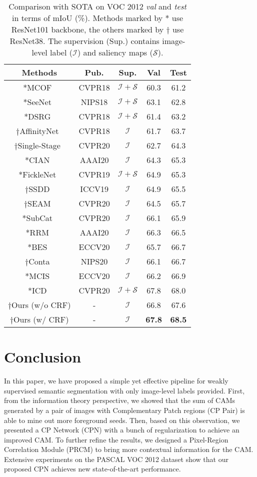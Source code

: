 \documentclass[10pt,twocolumn,letterpaper]{article}
\begin{document}
\begin{table}[!htbp]\small
\centering
\begin{tabular}{c|c|c|c|c}
\hline
Methods & Pub. & Sup. & Val & Test \\
\hline
*MCOF~\cite{MCOF} & CVPR18& $\mathcal{I+S}$ & 60.3 & 61.2\\
*SeeNet~\cite{Seenet} & NIPS18 & $\mathcal{I+S}$ & 63.1 & 62.8 \\
*DSRG~\cite{dsrg} &CVPR18 & $\mathcal{I+S}$ & 61.4 & 63.2\\
$\dagger$AffinityNet~\cite{affinity}&CVPR18&$\mathcal{I}$&61.7&63.7\\
$\dagger$Single-Stage~\cite{1stage} &CVPR20&$\mathcal{I}$&62.7&64.3\\
*CIAN~\cite{CIAN}&AAAI20&$\mathcal{I}$&64.3&65.3\\
*FickleNet~\cite{fickle}&CVPR19&$\mathcal{I+S}$&64.9&65.3\\
$\dagger$SSDD~\cite{SSDD}&ICCV19&$\mathcal{I}$&64.9&65.5\\
$\dagger$SEAM~\cite{seam}&CVPR20&$\mathcal{I}$&64.5&65.7\\
*SubCat~\cite{subE} &CVPR20&$\mathcal{I}$&66.1&65.9\\
*RRM~\cite{RMM} &AAAI20&$\mathcal{I}$&66.3&66.5\\
*BES~\cite{BES} &ECCV20&$\mathcal{I}$&65.7&66.7\\
$\dagger$Conta~\cite{conta}&NIPS20&$\mathcal{I}$&66.1&66.7\\
*MCIS~\cite{coatten}&ECCV20&$\mathcal{I}$&66.2&66.9\\
*ICD~\cite{ICD}&CVPR20&$\mathcal{I+S}$&67.8&68.0\\
\hline
$\dagger$Ours (w/o CRF) &-&$\mathcal{I}$&66.8&67.6\\
$\dagger$Ours (w/ CRF) &-&$\mathcal{I}$&\textbf{67.8}&\textbf{68.5}\\
\hline
\end{tabular}
\caption{Comparison with SOTA on VOC 2012 \textit{val} and \textit{test} in terms of mIoU (\%). Methods marked by * use ResNet101 backbone, the others marked by $\dagger$ use ResNet38. The supervision (Sup.) contains image-level label ($\mathcal{I}$) and saliency maps ($\mathcal{S}$).}
\label{tab:sota}
\end{table}
\section{Conclusion}
In this paper, we have proposed a simple yet effective pipeline for weakly supervised semantic segmentation with only image-level labels provided. First, from the information theory perspective, we showed that the sum of CAMs generated by a pair of images with Complementary Patch regions (CP Pair) is able to mine out more foreground seeds.
Then, based on this observation, we presented a CP Network (CPN) with a bunch of regularization to achieve an improved CAM.
To further refine the results, we designed a Pixel-Region Correlation Module (PRCM) to bring more contextual information for the CAM. Extensive experiments on the PASCAL VOC 2012 dataset show that our proposed CPN achieves new state-of-the-art performance.
\end{document}
